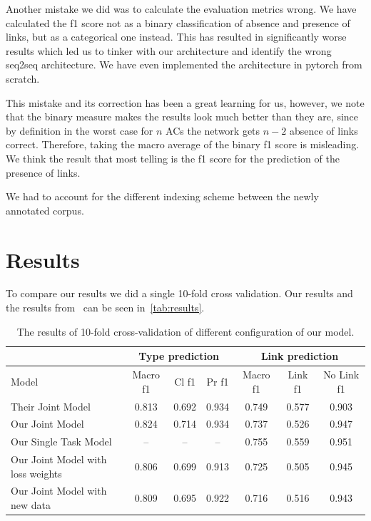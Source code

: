 \documentclass[onecolumn]{article}
\begin{document}
Another mistake we did was to calculate the evaluation metrics wrong.
We have calculated the f1 score not as a binary classification of absence and presence of links, but as a categorical one instead.
This has resulted in significantly worse results which led us to tinker with our architecture and identify the wrong seq2seq architecture. We have even implemented the architecture in pytorch from scratch.

This mistake and its correction has been a great learning for us, however, we note that the binary measure makes the results look much better than they are,
since by definition in the worst case for $n$ ACs the network gets $n-2$ absence of links correct. Therefore, taking the macro average of the binary f1 score is misleading. We think the result that most telling is the f1 score for the prediction of the presence of links.

We had to account for the different indexing scheme between the newly annotated corpus.

\section{Results}
To compare our results we did a single 10-fold cross validation. Our results and the results from~\cite{potash2017here} can be seen in~\autoref{tab:results}.

\begin{table}[h]
    \centering
    \begin{tabular}{| l || c | c | c | c | c | c |}
        \hline
        & \multicolumn{3}{|c|}{Type prediction} & \multicolumn{3}{|c|}{Link prediction} \\ 
        \hline
        Model & Macro f1 & Cl f1 & Pr f1 & Macro f1 & Link f1 & No Link f1 \\
        \hline
        Their Joint Model                 & 0.813 & 0.692 & 0.934 & 0.749 & 0.577 & 0.903 \\
        Our Joint Model                   & 0.824 & 0.714 & 0.934 & 0.737 & 0.526 & 0.947 \\
        Our Single Task Model             &   –   &   –   &   –   & 0.755 & 0.559 & 0.951 \\
        Our Joint Model with loss weights & 0.806 & 0.699 & 0.913 & 0.725 & 0.505 & 0.945 \\
        Our Joint Model with new data     & 0.809 & 0.695 & 0.922 & 0.716 & 0.516 & 0.943 \\
        \hline
    \end{tabular}
    \caption{The results of 10-fold cross-validation of different configuration of our model.}\label{tab:res}
\end{table}
\end{document}
